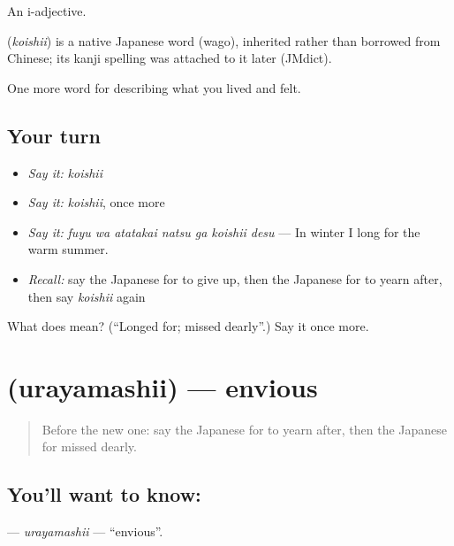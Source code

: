 An i-adjective.

\begin{cousinweb}
\textbf{} (\emph{koishii}) is a native Japanese word (wago), inherited rather than borrowed from Chinese; its kanji spelling was attached to it later (JMdict).
\end{cousinweb}

\begin{grammarlens}[title={What you've built}]
One more word for describing what you lived and felt.
\end{grammarlens}

\subsection*{Your turn}
\begin{itemize}
\raggedright
  \item \emph{Say it:} \emph{koishii}
  \item \emph{Say it:} \emph{koishii}, once more
  \item \emph{Say it:} \emph{fuyu wa atatakai natsu ga koishii desu} — In winter I long for the warm summer.
  \item \emph{Recall:} say the Japanese for to give up, then the Japanese for to yearn after, then say \emph{koishii} again
\end{itemize}

\begin{tcolorbox}[breakable,colback=teal!4,colframe=teal!35!black,title={Before you move on}]
What does  mean? (\textquotedblleft{}Longed for; missed dearly\textquotedblright{}.) Say it once more.
\end{tcolorbox}
\section[\texorpdfstring{\ja{うらやましい} (urayamashii)}{うらやましい (urayamashii)}]{ (urayamashii) — envious}

\label{lesson:JA-C433-urayamashii}



\begin{quote}
Before the new one: say the Japanese for to yearn after, then the Japanese for missed dearly.
\end{quote}

\subsection*{You'll want to know: }
\textbf{} — \emph{urayamashii} — \textquotedblleft{}envious\textquotedblright{}.

